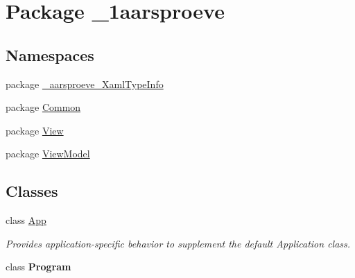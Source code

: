 \hypertarget{namespace__1aarsproeve}{}\section{Package \+\_\+1aarsproeve}
\label{namespace__1aarsproeve}
\subsection*{Namespaces}
\begin{DoxyCompactItemize}
\item 
package \hyperlink{namespace__1aarsproeve_1_1__aarsproeve___xaml_type_info}{\+\_\+aarsproeve\+\_\+\+Xaml\+Type\+Info}
\item 
package \hyperlink{namespace__1aarsproeve_1_1_common}{Common}
\item 
package \hyperlink{namespace__1aarsproeve_1_1_view}{View}
\item 
package \hyperlink{namespace__1aarsproeve_1_1_view_model}{View\+Model}
\end{DoxyCompactItemize}
\subsection*{Classes}
\begin{DoxyCompactItemize}
\item 
class \hyperlink{class__1aarsproeve_1_1_app}{App}
\begin{DoxyCompactList}\small\item\em Provides application-\/specific behavior to supplement the default Application class. \end{DoxyCompactList}\item 
class {\bfseries Program}
\end{DoxyCompactItemize}
